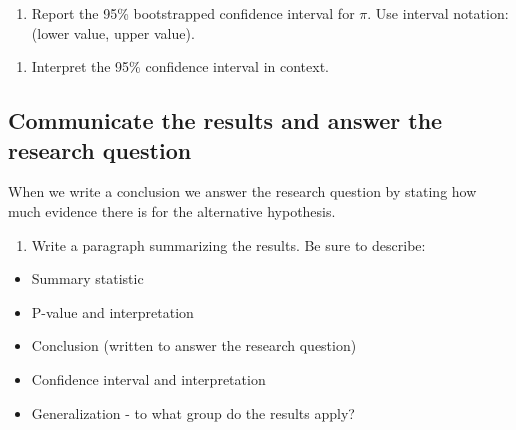 \documentclass[
]{report}
\providecommand{\tightlist}{%
  \setlength{\itemsep}{0pt}\setlength{\parskip}{0pt}}
\begin{document}
\vspace{.8in}

\begin{enumerate}
\def\labelenumi{\arabic{enumi}.}
\setcounter{enumi}{26}
\tightlist
\item
  Report the 95\% bootstrapped confidence interval for \(\pi\). Use interval notation: (lower value, upper value).
\end{enumerate}

\vspace{1in}

\begin{enumerate}
\def\labelenumi{\arabic{enumi}.}
\setcounter{enumi}{27}
\tightlist
\item
  Interpret the 95\% confidence interval in context.
\end{enumerate}

\vspace{.8in}

\hypertarget{communicate-the-results-and-answer-the-research-question}{%
\subsection*{Communicate the results and answer the research question}\label{communicate-the-results-and-answer-the-research-question}}

When we write a conclusion we answer the research question by stating how much evidence there is for the alternative hypothesis.

\begin{enumerate}
\def\labelenumi{\arabic{enumi}.}
\setcounter{enumi}{28}
\tightlist
\item
  Write a paragraph summarizing the results. Be sure to describe:
\end{enumerate}

\begin{itemize}
\item
  Summary statistic
\item
  P-value and interpretation
\item
  Conclusion (written to answer the research question)
\item
  Confidence interval and interpretation
\item
  Generalization - to what group do the results apply?
\end{itemize}

\vspace{3.5in}
\end{document}
